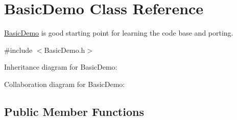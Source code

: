 \hypertarget{class_basic_demo}{\section{Basic\+Demo Class Reference}
\label{class_basic_demo}
}


\hyperlink{class_basic_demo}{Basic\+Demo} is good starting point for learning the code base and porting.  




{\ttfamily \#include $<$Basic\+Demo.\+h$>$}



Inheritance diagram for Basic\+Demo\+:


Collaboration diagram for Basic\+Demo\+:
\subsection*{Public Member Functions}
